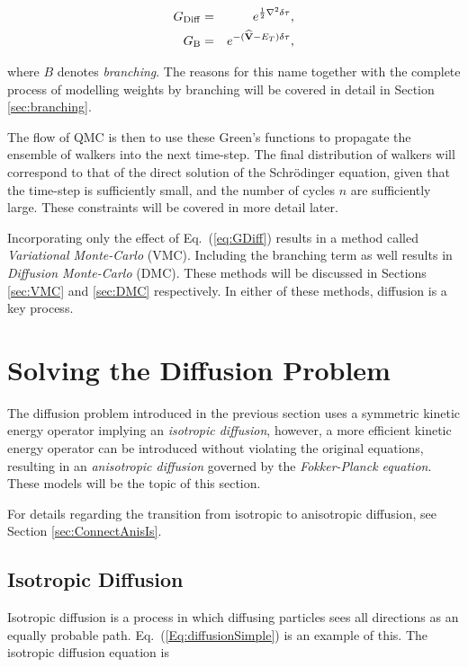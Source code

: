 \begin{eqnarray}
 G_\mathrm{Diff} &=& e^{\frac{1}{2}\nabla^2\delta\tau},\label{eq:GDiff} \\
 G_\mathrm{B} &=& e^{-({\bf\widehat{V}} - E_T)\delta\tau} \label{eq:GB},
\end{eqnarray}

where $B$ denotes \textit{branching}. The reasons for this name together with the complete process of modelling weights by branching will be covered in detail in Section \ref{sec:branching}.

The flow of QMC is then to use these Green's functions to propagate the ensemble of walkers into the next time-step. The final distribution of walkers will correspond to that of the direct solution of the Schrödinger equation, given that the time-step is sufficiently small, and the number of cycles $n$ are sufficiently large. These constraints will be covered in more detail later. 

Incorporating only the effect of Eq.~(\ref{eq:GDiff}) results in a method called \textit{Variational Monte-Carlo} (VMC). Including the branching term as well results in \textit{Diffusion Monte-Carlo} (DMC). These methods will be discussed in Sections \ref{sec:VMC} and \ref{sec:DMC} respectively. In either of these methods, diffusion is a key process.

\section{Solving the Diffusion Problem}
\label{sec:solvingDiff}

The diffusion problem introduced in the previous section uses a symmetric kinetic energy operator implying an \textit{isotropic diffusion}, however, a more efficient kinetic energy operator can be introduced without violating the original equations, resulting in an \textit{anisotropic diffusion} governed by the \textit{Fokker-Planck equation}. These models will be the topic of this section. 

For details regarding the transition from isotropic to anisotropic diffusion, see Section \ref{sec:ConnectAnisIs}.

\subsection{Isotropic Diffusion}

Isotropic diffusion is a process in which diffusing particles sees all directions as an equally probable path. Eq.~(\ref{Eq:diffusionSimple}) is an example of this. The isotropic diffusion equation is  

